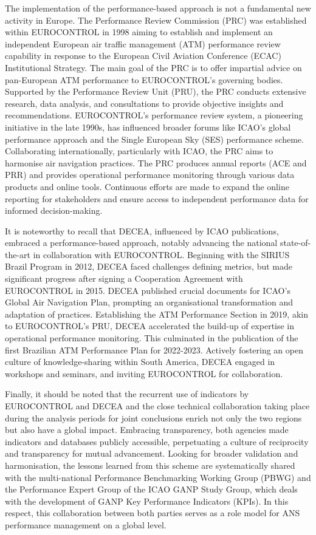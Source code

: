 \documentclass[
  a4paper,
  DIV=11,
  numbers=noendperiod]{scrreport}
\begin{document}
The implementation of the performance-based approach is not a
fundamental new activity in Europe. The Performance Review Commission
(PRC) was established within EUROCONTROL in 1998 aiming to establish and
implement an independent European air traffic management (ATM)
performance review capability in response to the European Civil Aviation
Conference (ECAC) Institutional Strategy. The main goal of the PRC is to
offer impartial advice on pan-European ATM performance to EUROCONTROL's
governing bodies. Supported by the Performance Review Unit (PRU), the
PRC conducts extensive research, data analysis, and consultations to
provide objective insights and recommendations. EUROCONTROL's
performance review system, a pioneering initiative in the late 1990s,
has influenced broader forums like ICAO's global performance approach
and the Single European Sky (SES) performance scheme. Collaborating
internationally, particularly with ICAO, the PRC aims to harmonise air
navigation practices. The PRC produces annual reports (ACE and PRR) and
provides operational performance monitoring through various data
products and online tools. Continuous efforts are made to expand the
online reporting for stakeholders and ensure access to independent
performance data for informed decision-making.

It is noteworthy to recall that DECEA, influenced by ICAO publications,
embraced a performance-based approach, notably advancing the national
state-of-the-art in collaboration with EUROCONTROL. Beginning with the
SIRIUS Brazil Program in 2012, DECEA faced challenges defining metrics,
but made significant progress after signing a Cooperation Agreement with
EUROCONTROL in 2015. DECEA published crucial documents for ICAO's Global
Air Navigation Plan, prompting an organisational transformation and
adaptation of practices. Establishing the ATM Performance Section in
2019, akin to EUROCONTROL's PRU, DECEA accelerated the build-up of
expertise in operational performance monitoring. This culminated in the
publication of the first Brazilian ATM Performance Plan for 2022-2023.
Actively fostering an open culture of knowledge-sharing within South
America, DECEA engaged in workshops and seminars, and inviting
EUROCONTROL for collaboration.

Finally, it should be noted that the recurrent use of indicators by
EUROCONTROL and DECEA and the close technical collaboration taking place
during the analysis periods for joint conclusions enrich not only the
two regions but also have a global impact. Embracing transparency, both
agencies made indicators and databases publicly accessible, perpetuating
a culture of reciprocity and transparency for mutual advancement.
Looking for broader validation and harmonisation, the lessons learned
from this scheme are systematically shared with the multi-national
Performance Benchmarking Working Group (PBWG) and the Performance Expert
Group of the ICAO GANP Study Group, which deals with the development of
GANP Key Performance Indicators (KPIs). In this respect, this
collaboration between both parties serves as a role model for ANS
performance management on a global level.
\end{document}
